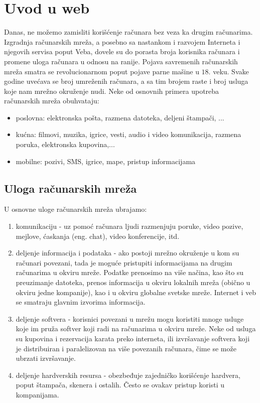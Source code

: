 \documentclass[a4paper]{article}
\begin{document}
\section{Uvod u web}
\label{sec:uvodweb}
Danas, ne možemo zamisliti korišćenje računara bez veza ka drugim računarima. Izgradnja računarskih mreža, a posebno sa nastankom i razvojem Interneta i njegovih servisa poput Veba, dovele su do porasta broja korisnika računara i promene uloga računara u odnosu na ranije. Pojava savremenih računarskih mreža smatra se revolucionarnom poput pojave parne mašine u $18.$ veku. Svake godine uvećava se broj umreženih računara, a sa tim brojem raste i broj usluga koje nam mrežno okruženje nudi. Neke od osnovnih primera upotreba računarskih mreža obuhvataju:
\begin{itemize}
\item poslovna: elektronska pošta, razmena datoteka, deljeni štampači, ...
\item kućna: filmovi, muzika, igrice, vesti, audio i video komunikacija, razmena poruka, elektronska kupovina,...
\item mobilne: pozivi, SMS, igrice, mape, pristup informacijama
\end{itemize}

\subsection{Uloga računarskih mreža}
U osnovne uloge računarskih mreža ubrajamo:
\begin{enumerate}

\item komunikaciju - uz pomoć računara ljudi razmenjuju poruke, video pozive, mejlove, ćaskanja (eng. chat), video konferencije, itd.
\item deljenje informacija i podataka - ako postoji mrežno okruženje u kom su računari povezani, tada je moguće pristupiti informacijama na drugim računarima u okviru mreže. Podatke prenosimo na više načina, kao što su preuzimanje datoteka, prenos informacija u okviru lokalnih mreža (obično u okviru jedne kompanije), kao i u okviru globalne svetske mreže. Internet i veb se smatraju glavnim izvorima informacija. 
\item deljenje softvera - korisnici povezani u mrežu mogu koristiti mnoge usluge koje im pruža softver koji radi na računarima u okviru mreže. Neke od usluga su kupovina i rezervacija karata preko interneta, ili izvršavanje softvera koji je distribuiran i paralelizovan na više povezanih računara, čime se može ubrzati izvršavanje.
\item deljenje hardverskih resursa - obezbeđuje zajedničko korišćenje hardvera, poput štampača, skenera i ostalih. Često se ovakav pristup koristi u kompanijama.
\end{enumerate} 
\end{document}

